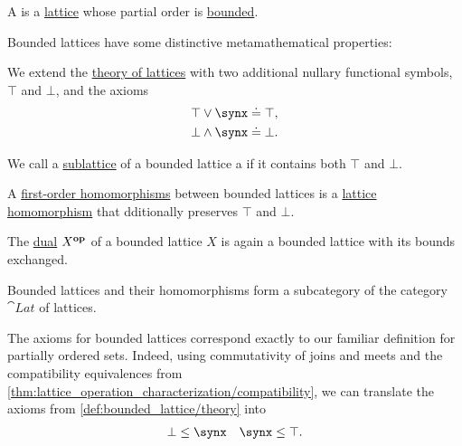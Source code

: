 \begin{definition}\label{def:bounded_lattice}
  A  is a \hyperref[def:lattice]{lattice} whose partial order is \hyperref[def:extremal_points/bounds]{bounded}.

  Bounded lattices have some distinctive metamathematical properties:
  \begin{thmenum}
    \mimprovised We extend the \hyperref[def:lattice/theory]{theory of lattices} with two additional nullary functional symbols, \( \top \) and \( \bot \), and the axioms
    \begin{align}
      \top \vee \synx \syneq \top \label{eq:def:bounded_lattice/theory/top}, \\
      \bot \wedge \synx \syneq \bot \label{eq:def:bounded_lattice/theory/bot}.
    \end{align}

    \mimprovised We call a \hyperref[def:lattice/submodel]{sublattice} of a bounded lattice a  if it contains both \( \top \) and \( \bot \).

     A \hyperref[def:first_order_homomorphism]{first-order homomorphisms} between bounded lattices is a \hyperref[def:lattice/homomorphism]{lattice homomorphism} that dditionally preserves \( \top \) and \( \bot \).

    \mimprovised The \hyperref[def:preordered_set/opposite]{dual} \( X^\oppos \) of a bounded lattice \( X \) is again a bounded lattice with its bounds exchanged.

    \mimprovised Bounded lattices and their homomorphisms form a subcategory of the category \( \cat{Lat} \) of lattices.
  \end{thmenum}
\end{definition}
\begin{comments}
  \item The axioms for bounded lattices correspond exactly to our familiar definition for partially ordered sets. Indeed, using commutativity of joins and meets and the compatibility equivalences from \cref{thm:lattice_operation_characterization/compatibility}, we can translate the axioms from \cref{def:bounded_lattice/theory} into
  \begin{align*}
    \bot \leq \synx && \synx \leq \top.
  \end{align*}
\end{comments}

